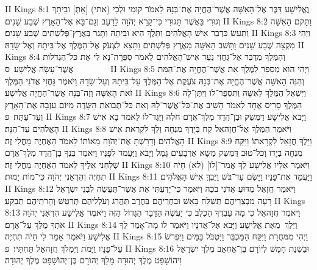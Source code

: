 II Kings 8:1	וֶאֱלִישָׁע דִּבֶּר אֶל־הָאִשָּׁה אֲשֶׁר־הֶחֱיָה אֶת־בְּנָהּ לֵאמֹר קוּמִי וּלְכִי (אתי) [אַתְּ] וּבֵיתֵךְ וְגוּרִי בַּאֲשֶׁר תָּגוּרִי כִּי־קָרָא יְהֹוָה לָרָעָב וְגַם־בָּא אֶל־הָאָרֶץ שֶׁבַע שָׁנִים׃
II Kings 8:2	וַתָּקם הָאִשָּׁה וַתַּעַשׂ כִּדְבַר אִישׁ הָאֱלֹהִים וַתֵּלֶךְ הִיא וּבֵיתָהּ וַתָּגר בְּאֶרֶץ־פְּלִשְׁתִּים שֶׁבַע שָׁנִים׃
II Kings 8:3	וַיְהִי מִקְצֵה שֶׁבַע שָׁנִים וַתָּשׁב הָאִשָּׁה מֵאֶרֶץ פְּלִשְׁתִּים וַתֵּצֵא לִצְעֹק אֶל־הַמֶּלֶךְ אֶל־בֵּיתָהּ וְאֶל־שָׂדָהּ׃
II Kings 8:4	וְהַמֶּלֶךְ מְדַבֵּר אֶל־גֵּחֲזִי נַעַר אִישׁ־הָאֱלֹהִים לֵאמֹר סַפְּרָה־נָּא לִי אֵת כּל־הַגְּדֹלוֹת אֲשֶׁר־עָשָׂה אֱלִישָׁע׃ {ס}        
II Kings 8:5	וַיְהִי הוּא מְסַפֵּר לַמֶּלֶךְ אֵת אֲשֶׁר־הֶחֱיָה אֶת־הַמֵּת וְהִנֵּה הָאִשָּׁה אֲשֶׁר־הֶחֱיָה אֶת־בְּנָהּ צֹעֶקֶת אֶל־הַמֶּלֶךְ עַל־בֵּיתָהּ וְעַל־שָׂדָהּ וַיֹּאמֶר גֵּחֲזִי אֲדֹנִי הַמֶּלֶךְ זֹאת הָאִשָּׁה וְזֶה־בְּנָהּ אֲשֶׁר־הֶחֱיָה אֱלִישָׁע׃
II Kings 8:6	וַיִּשְׁאַל הַמֶּלֶךְ לָאִשָּׁה וַתְּסַפֶּר־לוֹ וַיִּתֶּן־לָהּ הַמֶּלֶךְ סָרִיס אֶחָד לֵאמֹר הָשֵׁיב אֶת־כּל־אֲשֶׁר־לָהּ וְאֵת כּל־תְּבוּאֹת הַשָּׂדֶה מִיּוֹם עזְבָה אֶת־הָאָרֶץ וְעַד־עָתָּה׃ {פ}
II Kings 8:7	וַיָּבֹא אֱלִישָׁע דַּמֶּשֶׂק וּבֶן־הֲדַד מֶלֶךְ־אֲרָם חֹלֶה וַיֻּגַּד־לוֹ לֵאמֹר בָּא אִישׁ הָאֱלֹהִים עַד־הֵנָּה׃
II Kings 8:8	וַיֹּאמֶר הַמֶּלֶךְ אֶל־חֲזָהאֵל קַח בְּיָדְךָ מִנְחָה וְלֵךְ לִקְרַאת אִישׁ הָאֱלֹהִים וְדָרַשְׁתָּ אֶת־יְהֹוָה מֵאוֹתוֹ לֵאמֹר הַאֶחְיֶה מֵחֳלִי זֶה׃
II Kings 8:9	וַיֵּלֶךְ חֲזָאֵל לִקְרָאתוֹ וַיִּקַּח מִנְחָה בְיָדוֹ וְכל־טוּב דַּמֶּשֶׂק מַשָּׂא אַרְבָּעִים גָּמָל וַיָּבֹא וַיַּעֲמֹד לְפָנָיו וַיֹּאמֶר בִּנְךָ בֶן־הֲדַד מֶלֶךְ־אֲרָם שְׁלָחַנִי אֵלֶיךָ לֵאמֹר הַאֶחְיֶה מֵחֳלִי זֶה׃
II Kings 8:10	וַיֹּאמֶר אֵלָיו אֱלִישָׁע לֵךְ אֱמר־[לוֹ] (לא) חָיֹה תִחְיֶה וְהִרְאַנִי יְהֹוָה כִּי־מוֹת יָמוּת׃
II Kings 8:11	וַיַּעֲמֵד אֶת־פָּנָיו וַיָּשֶׂם עַד־בֹּשׁ וַיֵּבְךְּ אִישׁ הָאֱלֹהִים׃
II Kings 8:12	וַיֹּאמֶר חֲזָאֵל מַדּוּעַ אֲדֹנִי בֹכֶה וַיֹּאמֶר כִּי־יָדַעְתִּי אֵת אֲשֶׁר־תַּעֲשֶׂה לִבְנֵי יִשְׂרָאֵל רָעָה מִבְצְרֵיהֶם תְּשַׁלַּח בָּאֵשׁ וּבַחֻרֵיהֶם בַּחֶרֶב תַּהֲרֹג וְעֹלְלֵיהֶם תְּרַטֵּשׁ וְהָרֹתֵיהֶם תְּבַקֵּעַ׃
II Kings 8:13	וַיֹּאמֶר חֲזָהאֵל כִּי מָה עַבְדְּךָ הַכֶּלֶב כִּי יַעֲשֶׂה הַדָּבָר הַגָּדוֹל הַזֶּה וַיֹּאמֶר אֱלִישָׁע הִרְאַנִי יְהֹוָה אֹתְךָ מֶלֶךְ עַל־אֲרָם׃
II Kings 8:14	וַיֵּלֶךְ  מֵאֵת אֱלִישָׁע וַיָּבֹא אֶל־אֲדֹנָיו וַיֹּאמֶר לוֹ מָה־אָמַר לְךָ אֱלִישָׁע וַיֹּאמֶר אָמַר לִי חָיֹה תִחְיֶה׃
II Kings 8:15	וַיְהִי מִמּחֳרָת וַיִּקַּח הַמַּכְבֵּר וַיִּטְבֹּל בַּמַּיִם וַיִּפְרֹשׂ עַל־פָּנָיו וַיָּמֹת וַיִּמְלֹךְ חֲזָהאֵל תַּחְתָּיו׃ {פ}
II Kings 8:16	וּבִשְׁנַת חָמֵשׁ לְיוֹרָם בֶּן־אַחְאָב מֶלֶךְ יִשְׂרָאֵל וִיהוֹשָׁפָט מֶלֶךְ יְהוּדָה מָלַךְ יְהוֹרָם בֶּן־יְהוֹשָׁפָט מֶלֶךְ יְהוּדָה׃
